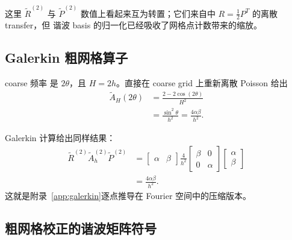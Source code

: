 这里 $\widetilde R^{(2)}$ 与 $\widetilde P^{(2)}$ 数值上看起来互为转置；它们来自中 $R=\frac12P^T$ 的离散 transfer，但 谐波 basis 的归一化已经吸收了网格点计数带来的缩放。

\subsection{Galerkin 粗网格算子}

coarse 频率 是 $2\theta$，且 $H=2h$。直接在 coarse grid 上重新离散 Poisson 给出
\begin{align}
\widetilde A_H(2\theta)
&=\frac{2-2\cos(2\theta)}{H^2}\\
&=\frac{\sin^2\theta}{h^2}
=\frac{4\alpha\beta}{h^2}.
\label{eq:lfa-coarse-poisson-symbol}
\end{align}

Galerkin 计算给出同样结果：
\begin{align}
\widetilde R^{(2)}
\widetilde A_h^{(2)}
\widetilde P^{(2)}
&=
\begin{bmatrix}\alpha&\beta\end{bmatrix}
\frac4{h^2}
\begin{bmatrix}\beta&0\\0&\alpha\end{bmatrix}
\begin{bmatrix}\alpha\\\beta\end{bmatrix}\\
&=\frac{4\alpha\beta}{h^2}.
\end{align}
这就是附录~\ref{app:galerkin}逐点推导在 Fourier 空间中的压缩版本。

\subsection{粗网格校正的谐波矩阵符号}

